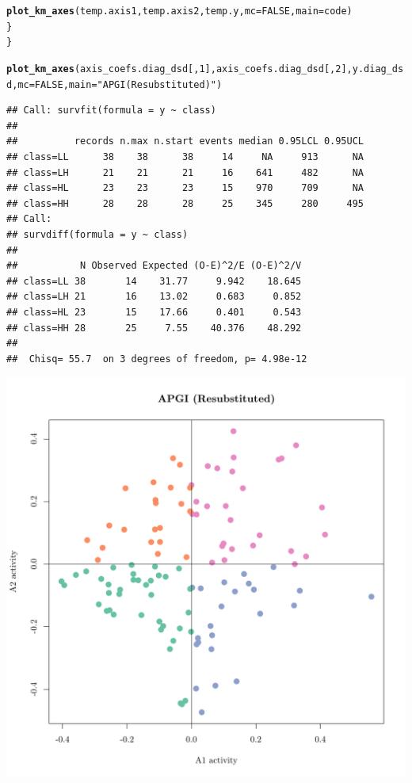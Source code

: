 \documentclass{article}\usepackage[]{graphicx}\usepackage[]{color}
\makeatletter
\def\maxwidth{ %
  \ifdim\Gin@nat@width>\linewidth
    \linewidth
  \else
    \Gin@nat@width
  \fi
}
\newcommand{\hlnum}[1]{\textcolor[rgb]{0.686,0.059,0.569}{#1}}%
\newcommand{\hlstr}[1]{\textcolor[rgb]{0.192,0.494,0.8}{#1}}%
\newcommand{\hlstd}[1]{\textcolor[rgb]{0.345,0.345,0.345}{#1}}%
\newcommand{\hlkwc}[1]{\textcolor[rgb]{0.333,0.667,0.333}{#1}}%
\newcommand{\hlkwd}[1]{\textcolor[rgb]{0.737,0.353,0.396}{\textbf{#1}}}%
\newenvironment{kframe}{%
 \def\at@end@of@kframe{}%
 \ifinner\ifhmode%
  \def\at@end@of@kframe{\end{minipage}}%
  \begin{minipage}{\columnwidth}%
 \fi\fi%
 \def\FrameCommand##1{\hskip\@totalleftmargin \hskip-\fboxsep
 \colorbox{shadecolor}{##1}\hskip-\fboxsep
     \hskip-\linewidth \hskip-\@totalleftmargin \hskip\columnwidth}%
 \MakeFramed {\advance\hsize-\width
   \@totalleftmargin\z@ \linewidth\hsize
   \@setminipage}}%
 {\par\unskip\endMakeFramed%
 \at@end@of@kframe}
\newenvironment{knitrout}{}{} %
\makeatother
\begin{document}
\begin{knitrout}
\begin{kframe}
\begin{alltt}
                \hlkwd{plot_km_axes}\hlstd{(temp.axis1, temp.axis2, temp.y,} \hlkwc{mc} \hlstd{=} \hlnum{FALSE}\hlstd{,} \hlkwc{main} \hlstd{= code)}
        \hlstd{\}}
\hlstd{\}}

\hlkwd{plot_km_axes}\hlstd{(axis_coefs.diag_dsd[,}\hlnum{1}\hlstd{], axis_coefs.diag_dsd[,}\hlnum{2}\hlstd{], y.diag_dsd,} \hlkwc{mc} \hlstd{=} \hlnum{FALSE}\hlstd{,} \hlkwc{main} \hlstd{=} \hlstr{"APGI (Resubstituted)"}\hlstd{)}
\end{alltt}
\begin{verbatim}
## Call: survfit(formula = y ~ class)
## 
##          records n.max n.start events median 0.95LCL 0.95UCL
## class=LL      38    38      38     14     NA     913      NA
## class=LH      21    21      21     16    641     482      NA
## class=HL      23    23      23     15    970     709      NA
## class=HH      28    28      28     25    345     280     495
## Call:
## survdiff(formula = y ~ class)
## 
##           N Observed Expected (O-E)^2/E (O-E)^2/V
## class=LL 38       14    31.77     9.942    18.645
## class=LH 21       16    13.02     0.683     0.852
## class=HL 23       15    17.66     0.401     0.543
## class=HH 28       25     7.55    40.376    48.292
## 
##  Chisq= 55.7  on 3 degrees of freedom, p= 4.98e-12
\end{verbatim}
\end{kframe}

{\centering \includegraphics[width=\maxwidth]{figure/km-curves-1} 

}
\end{knitrout}
\end{document}
